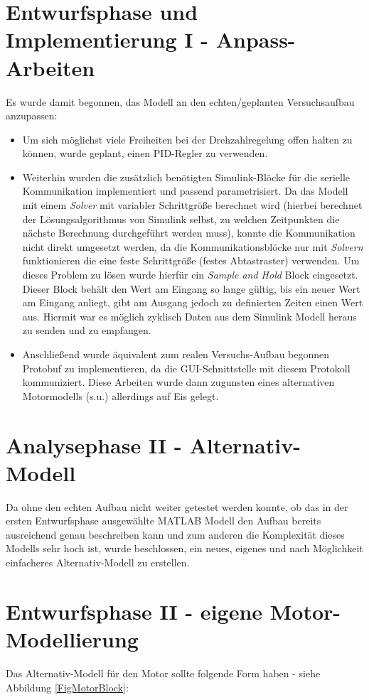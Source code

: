 \section{Entwurfsphase und Implementierung I - Anpass-Arbeiten}
Es wurde damit begonnen, das Modell an den echten/geplanten Versuchsaufbau anzupassen:  
\begin{itemize}
	\item Um sich möglichst viele Freiheiten bei der Drehzahlregelung offen halten zu können, wurde geplant, einen PID-Regler zu verwenden. 
	\item Weiterhin wurden die zusätzlich benötigten Simulink-Blöcke für die serielle Kommunikation implementiert und passend parametrisiert. Da das Modell mit einem \textit{Solver} mit variabler Schrittgröße berechnet wird (hierbei berechnet der Lösungsalgorithmus von Simulink selbst, zu welchen Zeitpunkten die nächste Berechnung durchgeführt werden muss), konnte die Kommunikation nicht direkt umgesetzt werden, da die Kommunikationsblöcke nur mit \textit{Solvern} funktionieren die eine feste Schrittgröße (festes Abtastraster) verwenden. 
	Um dieses Problem zu lösen wurde hierfür ein \textit{Sample and Hold} Block eingesetzt. Dieser Block behält den Wert am Eingang so lange gültig, bis ein neuer Wert am Eingang anliegt, gibt am Ausgang jedoch zu definierten Zeiten einen Wert aus. Hiermit war es möglich zyklisch Daten aus dem Simulink Modell heraus zu senden und zu empfangen.
	\item Anschließend wurde äquivalent zum realen Versuchs-Aufbau begonnen Protobuf zu implementieren, da die GUI-Schnittstelle mit diesem Protokoll kommuniziert. Diese Arbeiten wurde dann zugunsten eines alternativen Motormodells (s.u.) allerdings auf Eis gelegt.
\end{itemize}

\section{Analysephase II - Alternativ-Modell}
Da ohne den echten Aufbau nicht weiter getestet werden konnte, ob das in der ersten Entwurfsphase ausgewählte MATLAB Modell den Aufbau bereits ausreichend genau beschreiben kann und zum anderen die Komplexität dieses Modells sehr hoch ist, wurde beschlossen, ein neues, eigenes und nach Möglichkeit einfacheres Alternativ-Modell zu erstellen.

\section{Entwurfsphase II - eigene Motor-Modellierung}
Das Alternativ-Modell für den Motor sollte folgende Form haben - siehe Abbildung \ref{FigMotorBlock}:

